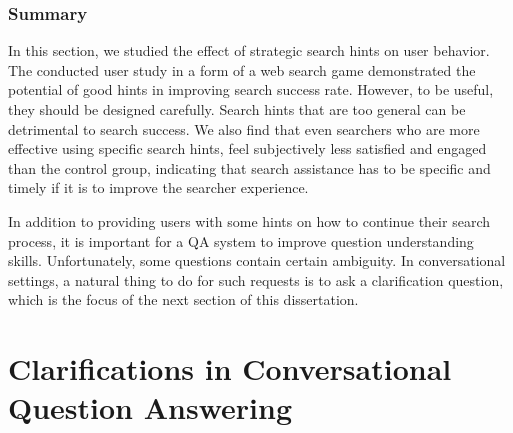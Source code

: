 
\subsubsection{Summary}
\label{section:conversation:hints:summary}

In this section, we studied the effect of strategic search hints on user behavior. 
The conducted user study in a form of a web search game demonstrated the potential of good hints in improving search success rate.
However, to be useful, they should be designed carefully.
Search hints that are too general can be detrimental to search success.
We also find that even searchers who are more effective using specific search hints, feel subjectively less satisfied and engaged than the control group, indicating that search assistance has to be specific and timely if it is to improve the searcher experience.

In addition to providing users with some hints on how to continue their search process, it is important for a QA system to improve question understanding skills.
Unfortunately, some questions contain certain ambiguity.
In conversational settings, a natural thing to do for such requests is to ask a clarification question, which is the focus of the next section of this dissertation.



\section{Clarifications in Conversational Question Answering}
\label{section:conversation:clarq}

